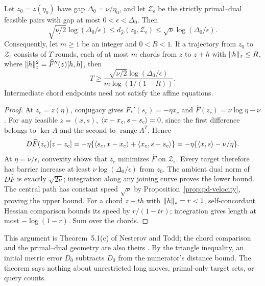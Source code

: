 \begin{theorem}
\label{thm:pd-gap-movement}
Let $z_0=z(\eta_0)$ have gap $\Delta_0=\nu/\eta_0$, and let
$\mathcal Z_\epsilon$ be the strictly primal--dual feasible pairs with
gap at most $0<\epsilon<\Delta_0$. Then
\begin{equation}\label{eq:pd-gap-distance}
 \sqrt{\nu/2}\log(\Delta_0/\epsilon)
 \leq d_{\widehat F}(z_0,\mathcal Z_\epsilon)
 \leq\sqrt\nu\log(\Delta_0/\epsilon).
\end{equation}
Consequently, let $m\geq1$ be an integer and $0<R<1$. If a
trajectory from $z_0$ to $\mathcal Z_\epsilon$ consists of $T$ rounds,
each of at most $m$ chords from $z$ to $z+h$ with
$\lVert h\rVert_z\leq R$, where $\lVert h\rVert_z^2=\widehat F''(z)[h,h]$, then
\begin{equation}\label{eq:pd-round-bound}
 T\geq\frac{\sqrt{\nu/2}\log(\Delta_0/\epsilon)}
                  {m\log(1/(1-R))}.
\end{equation}
Intermediate chord endpoints need not satisfy the affine equations.
\end{theorem}
\begin{proof}
At $z_c=z(\eta)$, conjugacy gives $F_*'(s_c)=-\eta x_c$ and
$\widehat F(z_c)=\nu\log\eta-\nu$. For any feasible $z=(x,s)$,
$\langle x-x_c,s-s_c\rangle=0$, since the first difference belongs to
$\ker A$ and the second to $\operatorname{range}A^T$. Hence
\[
 D\widehat F(z_c)[z-z_c]
 =-\eta\{\langle s_c,x-x_c\rangle+\langle x_c,s-s_c\rangle\}
 =-\eta\{\langle x,s\rangle-\nu/\eta\}.
\]
At $\eta=\nu/\epsilon$, convexity shows that $z_c$ minimizes
$\widehat F$ on $\mathcal Z_\epsilon$. Every target therefore has
barrier increase at least $\nu\log(\Delta_0/\epsilon)$ from $z_0$.
The ambient dual norm of $D\widehat F$ is exactly $\sqrt{2\nu}$;
integration along any joining curve proves the lower bound. The central
path has constant speed $\sqrt\nu$ by
Proposition~\ref{prop:pd-velocity}, proving the upper bound.
For a chord $z+t h$ with $\lVert h\rVert_z=r<1$, self-concordant Hessian
comparison bounds its speed by $r/(1-tr)$; integration gives length
at most $-\log(1-r)$. Sum over the chords.
\end{proof}
This argument is Theorem~5.1(c) of Nesterov and Todd; the chord
comparison and the primal--dual geometry are also theirs
\cite[Section~3 and Theorems~5.1--5.2]{NT2002}.
By the triangle inequality, an initial metric error $D_0$ subtracts
$D_0$ from the numerator's distance bound. The theorem says nothing
about unrestricted long moves, primal-only target sets, or query counts.

